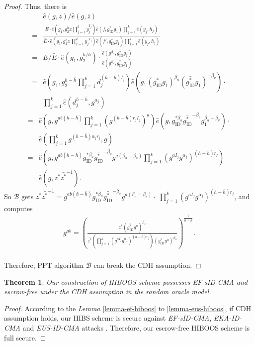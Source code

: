 \documentclass[times]{secauth}
\newtheorem{theorem}{Theorem}[section]
\theoremstyle{definition}
\theoremstyle{remark}
\begin{document}
\begin{proof}
Thus, there is 
\begin{align*}
&\hat{e}(g, z)/\hat{e}(g,\bar{z}) \\
=&\frac{E\cdot \hat{e}(g_1, g_2^hx\prod_{j=1}^k y_j^{I_j})\hat{e}(f, g^*_{\mathrm{ID}}g_1)\prod_{j=1}^k \hat{e}(y_j, h_j)}{\bar{E}\cdot \hat{e}(g_1, g_2^{\bar{h}}x\prod_{j=1}^k {y_j}^{I_j})\hat{e}(f', \bar{g^*_{\mathrm{ID}}}g_1)\prod_{j=1}^k \hat{e}(y_j, h_j)}\\
=& E/\bar{E}\cdot \hat{e}(g_1, g_2^{h/\bar{h}})\cdot \frac{\hat{e}(g^{\beta_u}, g^*_{\mathrm{ID}}g_1)}{\hat{e}(g^{\beta_v}, \bar{g^*_{\mathrm{ID}}}g_1)}\\
=& \hat{e}(g_1, g_2^{h-\bar{h}}\prod_{j=1}^k d_j^{(h-\bar{h})I_j})\hat{e}(g, (g^*_{\mathrm{ID}}g_1)^{\beta_u}(\bar{g^*_{\mathrm{ID}}}g_1)^{-\beta_v})\cdot\\
&\prod_{j=1}^k \hat{e}(d_j^{h-\bar{h}}, g^{\alpha_j})
\end{align*}
\begin{align*}
=& \hat{e}(g, g^{ab(h-\bar{h})}\prod_{j=1}^k (g^{(h-\bar{h})r_jI_j})^a) \hat{e}(g, g_{\mathrm{ID}}^{*\beta_u}\bar{g^*_{\mathrm{ID}}}^{-\beta_v} g_1^{\beta_u-\beta_v})\cdot\\
&\hat{e}(\prod_{j=1}^k g^{(h-\bar{h})\alpha_jr_j}, g)\\
=& \hat{e}(g, g^{ab(h-\bar{h})} g_{\mathrm{ID}}^{*\beta_u}\bar{g^*_{\mathrm{ID}}}^{-\beta_v} g^{a(\beta_u-\beta_v)} \prod_{j=1}^k (g^{aI_j} g^{\alpha_j})^{(h-\bar{h})r_j})\\
=& \hat{e}(g, z^*\bar{z^*}^{-1}).
\end{align*}
So $\mathcal{B}$ gets $z^*\bar{z^*}^{-1} = g^{ab(h-\bar{h})} g_{\mathrm{ID}}^{*\beta_u}\bar{g^*_{\mathrm{ID}}}^{-\beta_v} g^{a(\beta_u-\beta_v)}\cdot$ $ \prod_{j=1}^k (g^{aI_j} g^{\alpha_j})^{(h-\bar{h})r_j}$, and computes 
\begin{align*}
g^{ab} = \left(\frac{z^* (\bar{g^*_{\mathrm{ID}}}g^a)^{\beta_v}}{\bar{z^*}\left(\prod_{j=1}^k (g^{aI_j} g^{\alpha_j})^{(h-\bar{h})r_j} \right) (g_{\mathrm{ID}}^* g^a)^{\beta_u}}\right)^{\frac{1}{h-\bar{h}}}.
\end{align*}
\vspace{0.2cm}
\\
Therefore, PPT algorithm $\mathcal{B}$ can break the CDH assumption.
\end{proof}

\begin{theorem}
Our construction of HIBOOS scheme possesses EF-sID-CMA and escrow-free under the CDH assumption in the random oracle model.
\end{theorem}
\begin{proof}
According to the \emph{Lemma} \ref{lemma-ef-hiboos} to \ref{lemma-eus-hiboos}, if CDH assumption holds, our HIBS scheme is secure against \emph{EF-sID-CMA}, \emph{EKA-ID-CMA} and \emph{EUS-ID-CMA} attacks . 
Therefore, our escrow-free HIBOOS scheme is full secure.
\end{proof}
\end{document}
